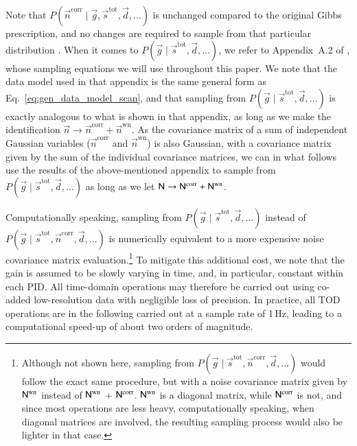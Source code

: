 \documentclass[twocolumn]{aa}
\renewcommand{\d}[0]{\vec{d}}
\newcommand{\n}[0]{\vec{n}}
\newcommand{\s}[0]{\vec{s}}
\newcommand{\g}[0]{\vec{g}}
\newcommand{\N}[0]{\tens{N}}
\newcommand{\tot}[0]{^{\mathrm{tot}}}
\newcommand{\corr}[0]{^{\mathrm{corr}}}
\newcommand{\wn}[0]{^{\mathrm{wn}}}
\begin{document}
Note that $P(\n\corr\mid\g, \s\tot, \d, \ldots)$ is unchanged compared to
the original Gibbs prescription, and no changes are required to sample
from that particular distribution \citep[see][for more details on this
sampling process]{bp06}. When it comes to ${P(\g\mid\s\tot, \d, \ldots)}$, we refer to Appendix~A.2 of \citet{bp01}, whose sampling equations we will use throughout this paper. We note that the data model used in that appendix is the same general form as Eq.~\eqref{eq:gen_data_model_scan}, and that sampling from $P(\g\mid\s\tot, \d, \ldots)$ is exactly analogous to what is shown in that appendix, as long as we make the identification $\n \rightarrow \n\corr + \n\wn$. As the covariance matrix of a sum of independent Gaussian variables ($\n\corr$ and $\n\wn$) is also Gaussian, with a covariance matrix given by the sum of the individual covariance matrices, we can in what follows use the results of the above-mentioned appendix to sample from $P(\g\mid\s\tot, \d, \ldots)$ as long as we let $\N \rightarrow \N\corr + \N\wn$.

Computationally speaking, sampling from $P(\g\mid\s\tot, \d, \ldots)$ instead of $P(\g\mid\s\tot, \n\corr, \d, \ldots)$ is numerically equivalent to a
more expensive noise covariance matrix evaluation.\footnote{Although not shown here, sampling from $P(\g\mid\s\tot, \n\corr, \d, \ldots)$ would follow the exact same procedure, but with a noise covariance matrix given by $\N\wn$ instead of $\N\wn$ + $\N\corr$. $\N\wn$ is a diagonal matrix, while $\N\corr$ is not, and since most operations are less heavy, computationally speaking, when diagonal matrices are involved, the resulting sampling process would also be lighter in that case.} To mitigate this
additional cost, we note that the gain is assumed to be slowly varying
in time, and, in particular, constant within each PID. All time-domain
operations may therefore be carried out using co-added low-resolution
data with negligible loss of precision. In practice, all TOD
operations are in the following carried out at a sample rate of 1\,Hz,
leading to a computational speed-up of about two orders of
magnitude.
\end{document}
